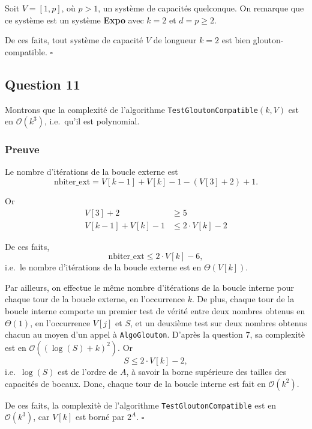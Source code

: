 \documentclass[12pt,a4paper]{article}
\newcommand{\BigO}{\mathcal{O}}
\begin{document}
 Soit $V = [1, p]$, o\`u $p > 1$, un syst\`eme de capacit\'es quelconque. On remarque que ce syst\`eme est un syst\`eme {\bfseries Expo} avec $k = 2$ et $d = p \geq 2$.

 De ces faits, tout syst\`eme de capacit\'e $V$ de longueur $k = 2$ est bien glouton-compatible. \hfill\ensuremath{\square}
 
 \subsection*{Question 11}
 Montrons que la complexit\'e de l'algorithme \texttt{TestGloutonCompatible}$(k, V)$ est en $\BigO(k^3)$, i.e.\ qu'il est polynomial.

 \subsubsection*{Preuve}
 Le nombre d'it\'erations de la boucle externe est  
 \begin{equation*}
    \text{nbiter\_ext} = V[k-1]+V[k]-1 -(V[3]+2) +1.
 \end{equation*}
 
 Or 
 \begin{align*}
 V[3]+2 &\geq 5 \\
 V[k-1]+V[k]-1 &\leq 2\cdot V[k] - 2 
\end{align*}
 
 De ces faits, 
 \begin{equation*}
    \text{nbiter\_ext} \leq 2\cdot V[k] - 6,
 \end{equation*}
 i.e.\ le nombre d'it\'erations de la boucle externe est en $\Theta(V[k])$.
 
 Par ailleurs, on effectue le m\^eme nombre d'it\'erations de la boucle interne pour chaque tour de la boucle externe, en l'occurrence $k$. De plus, chaque tour de la boucle interne comporte un premier test de v\'erit\'e entre deux nombres obtenus en $\Theta(1)$, en l'occurrence $V[j]$ et $S$, et un deuxi\`eme test sur deux nombres obtenus chacun au moyen d'un appel \`a \texttt{AlgoGlouton}. 
 D'apr\`es la question 7, sa complexit\`e est en $\BigO((\log(S) + k)^2)$. 
 Or 
 \begin{equation*}
  S \leq 2\cdot V[k] - 2,
 \end{equation*}
 i.e.\ $\log(S)$ est de l'ordre de $A$, \`a savoir la borne sup\'erieure des tailles des capacit\'es de bocaux.
 Donc, chaque tour de la boucle interne est fait en $\BigO(k^2)$.
 
 De ces faits, la complexit\`e de l'algorithme \texttt{TestGloutonCompatible} est en $\BigO(k^3)$, car $V[k]$ est born\'e par $2^A$. \hfill\ensuremath{\square}
 
\end{document}
